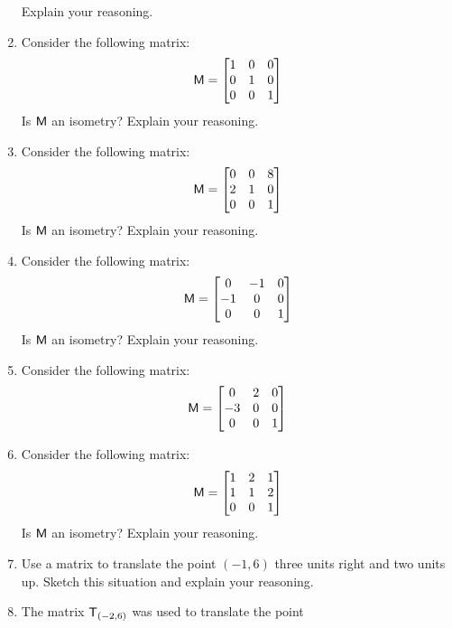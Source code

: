 \begin{problems}
\begin{enumerate}
  Explain your reasoning.
\item Consider the following matrix:
\[
\mathsf{M} = 
\begin{bmatrix}
1 & 0 & 0\\
0 & 1 & 0\\
0 & 0 & 1
\end{bmatrix}
\]
Is $\mathsf{M}$ an isometry? Explain your reasoning.
\item Consider the following matrix:
\[
\mathsf{M} = 
\begin{bmatrix}
0 & 0 & 8\\
2 & 1 & 0\\
0 & 0 & 1
\end{bmatrix}
\]
Is $\mathsf{M}$ an isometry? Explain your reasoning.
\item Consider the following matrix:
\[
\mathsf{M} = 
\begin{bmatrix}
0  & -1  & 0\\
-1 & 0  & 0\\
0  & 0  & 1
\end{bmatrix}
\]
Is $\mathsf{M}$ an isometry? Explain your reasoning.
\item Consider the following matrix:
\[
\mathsf{M} = 
\begin{bmatrix}
0  & 2  & 0\\
-3 & 0  & 0\\
0  & 0  & 1
\end{bmatrix}
\]
\item Consider the following matrix:
\[
\mathsf{M} = 
\begin{bmatrix}
1  & 2  & 1\\
1 & 1  & 2\\
0  & 0  & 1
\end{bmatrix}
\]
Is $\mathsf{M}$ an isometry? Explain your reasoning.
\item Use a matrix to translate the point $(-1,6)$ three units right
  and two units up. Sketch this situation and explain your reasoning.
\item The matrix $\mathsf{T}_{(-2,6)}$ was used to translate the point

\end{enumerate}
\end{problems}
